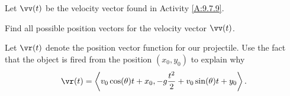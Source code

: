 \begin{activity} \label{A:9.7.10} Let $\vv(t)$ be the velocity vector found in Activity \ref{A:9.7.9}.
\ba
    \item Find all possible position vectors for the velocity vector $\vv(t)$.



\begin{comment}

If $\vr$ is the vector-valued function that gives the position of the object at time $t$, then
\[\vr(t) = \int \vv(t) \ dt = \left\langle v_0 \cos(\theta)t, -g\frac{t^2}{2} + v_0 \sin(\theta)t \right\rangle + \vk,\]
where $\vk$ is some constant vector.

\end{comment}

    \item Let $\vr(t)$ denote the position vector function for our projectile. Use the fact that the object is fired from the position $(x_0, y_0)$ to explain why
\[\vr(t) = \left\langle v_0 \cos(\theta)t + x_0, -g\frac{t^2}{2} + v_0 \sin(\theta)t + y_0 \right\rangle.\]



\begin{comment}

Now $\vr(0) = \langle x_0, y_0 \rangle$, so we have
\[\langle x_0, y_0 \rangle =  \langle v_0 \cos(\theta)(0), -g\frac{0^2}{2} + v_0 \sin(\theta)(0) \rangle + \vk\]
and
\[\vk = \langle x_0, y_0 \rangle.\]
We conclude that
\[\vr(t) = \langle v_0 \cos(\theta)t + x_0, -g\frac{t^2}{2} + v_0 \sin(\theta)t + y_0 \rangle.\]

\end{comment}

    \ea

\end{activity}
\begin{smallhint}

\end{smallhint}
\begin{bighint}

\end{bighint}
\begin{activitySolution}

\end{activitySolution}
\aftera
